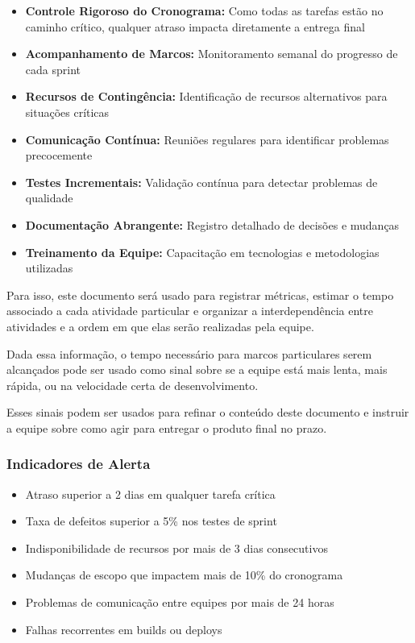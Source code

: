 \begin{itemize}
    \item \textbf{Controle Rigoroso do Cronograma:} Como todas as tarefas estão no caminho crítico, qualquer atraso impacta diretamente a entrega final
    \item \textbf{Acompanhamento de Marcos:} Monitoramento semanal do progresso de cada sprint
    \item \textbf{Recursos de Contingência:} Identificação de recursos alternativos para situações críticas
    \item \textbf{Comunicação Contínua:} Reuniões regulares para identificar problemas precocemente
    \item \textbf{Testes Incrementais:} Validação contínua para detectar problemas de qualidade
    \item \textbf{Documentação Abrangente:} Registro detalhado de decisões e mudanças
    \item \textbf{Treinamento da Equipe:} Capacitação em tecnologias e metodologias utilizadas
\end{itemize}

Para isso, este documento será usado para registrar métricas, estimar o tempo associado a cada atividade particular e organizar a interdependência entre atividades e a ordem em que elas serão realizadas pela equipe.

Dada essa informação, o tempo necessário para marcos particulares serem alcançados pode ser usado como sinal sobre se a equipe está mais lenta, mais rápida, ou na velocidade certa de desenvolvimento.

Esses sinais podem ser usados para refinar o conteúdo deste documento e instruir a equipe sobre como agir para entregar o produto final no prazo.

\subsubsection{Indicadores de Alerta}

\begin{itemize}
    \item Atraso superior a 2 dias em qualquer tarefa crítica
    \item Taxa de defeitos superior a 5\% nos testes de sprint
    \item Indisponibilidade de recursos por mais de 3 dias consecutivos
    \item Mudanças de escopo que impactem mais de 10\% do cronograma
    \item Problemas de comunicação entre equipes por mais de 24 horas
    \item Falhas recorrentes em builds ou deploys
\end{itemize}

